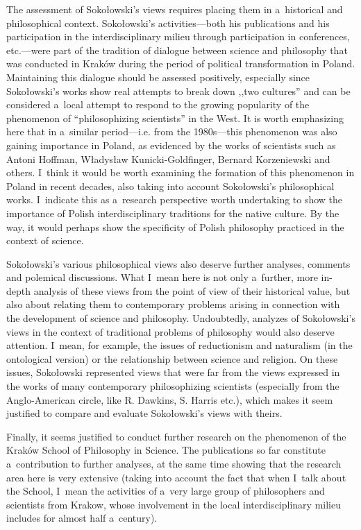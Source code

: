 \documentclass[%
  manuscript=article,
  year=2024,
  volume=77,
  doi=10.59203/zfn.77.689,
]{zfn}
\begin{document}
The assessment of Sokołowski's views requires placing them in a~historical and philosophical context. Sokołowski's activities---both his publications and his participation in the interdisciplinary milieu through participation in conferences, etc.---were part of the tradition of dialogue between science and philosophy that was conducted in Kraków during the period of political transformation in Poland. Maintaining this dialogue should be assessed positively, especially since Sokołowski's works show real attempts to break down ,,two cultures'' 
\parencite[][]{Snow1999Dwie} %
 and can be considered a~local attempt to respond to the growing popularity of the phenomenon of ``philosophizing scientists'' in the West. It is worth emphasizing here that in a~similar period---i.e. from the 1980s---this phenomenon was also gaining importance in Poland, as evidenced by the works of scientists such as Antoni Hoffman, Władysław Kunicki-Goldfinger, Bernard Korzeniewski and others. I~think it would be worth examining the formation of this phenomenon in Poland in recent decades, also taking into account Sokołowski's philosophical works. I~indicate this as a~research perspective worth undertaking to show the importance of Polish interdisciplinary traditions for the native culture. By the way, it would perhaps show the specificity of Polish philosophy practiced in the context of science.



Sokołowski's various philosophical views also deserve further analyses, comments and polemical discussions. What I~mean here is not only a~further, more in-depth analysis of these views from the point of view of their historical value, but also about relating them to contemporary problems arising in connection with the development of science and philosophy. Undoubtedly, analyzes of Sokołowski's views in the context of traditional problems of philosophy would also deserve attention. I~mean, for example, the issues of reductionism and naturalism (in the ontological version) or the relationship between science and religion. On these issues, Sokołowski represented views that were far from the views expressed in the works of many contemporary philosophizing scientists (especially from the Anglo-American circle, like R. Dawkins, S. Harris etc.), which makes it seem justified to compare and evaluate Sokołowski's views with theirs.



Finally, it seems justified to conduct further research on the phenomenon of the Kraków School of Philosophy in Science. The publications so far constitute a~contribution to further analyses, at the same time showing that the research area here is very extensive (taking into account the fact that when I~talk about the School, I~mean the activities of a~very large group of philosophers and scientists from Krakow, whose involvement in the local interdisciplinary milieu includes for almost half a~century).





\printbibliography
\end{document}

